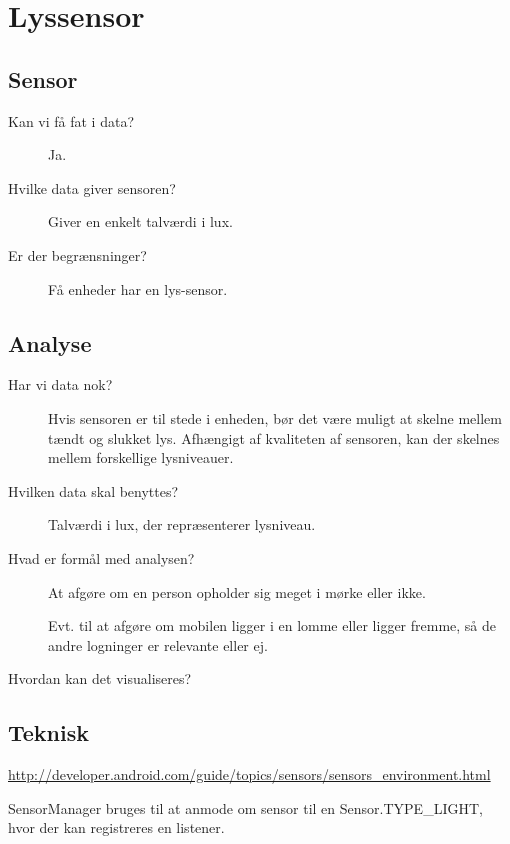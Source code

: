 \section{Lyssensor}

\subsection{Sensor}

\begin{description}
\item[Kan vi få fat i data?]
Ja.

\item[Hvilke data giver sensoren?]
Giver en enkelt talværdi i lux.

\item[Er der begrænsninger?]
Få enheder har en lys-sensor.

\end{description}

\subsection{Analyse}
\begin{description}
\item[Har vi data nok?]
Hvis sensoren er til stede i enheden, bør det være muligt at skelne mellem tændt og slukket lys.
Afhængigt af kvaliteten af sensoren, kan der skelnes mellem forskellige lysniveauer.

\item[Hvilken data skal benyttes?]
Talværdi i lux, der repræsenterer lysniveau.

\item[Hvad er formål med analysen?]
At afgøre om en person opholder sig meget i mørke eller ikke.

Evt. til at afgøre om mobilen ligger i en lomme eller ligger fremme, så de andre logninger er relevante eller ej.

\item[Hvordan kan det visualiseres?]

\end{description}

\subsection{Teknisk}
\url{http://developer.android.com/guide/topics/sensors/sensors_environment.html}

SensorManager bruges til at anmode om sensor til en Sensor.TYPE\_LIGHT, hvor der kan registreres en listener.
